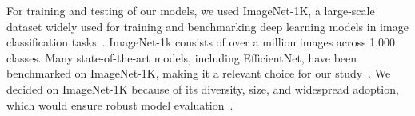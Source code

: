 For training and testing of our models, we used ImageNet-1K, a large-scale dataset widely used for training and benchmarking deep learning models in image classification tasks~\cite{DBLP:conf/cvpr/DengDSLL009}. ImageNet-1k consists of over a million images across 1,000 classes. Many state-of-the-art models, including EfficientNet, have been benchmarked on ImageNet-1K, making it a relevant choice for our study~\cite{DBLP:conf/icml/TanL19}. We decided on ImageNet-1K because of its diversity, size, and widespread adoption, which would ensure robust model evaluation~\cite{DBLP:journals/cacm/KrizhevskySH17}.


